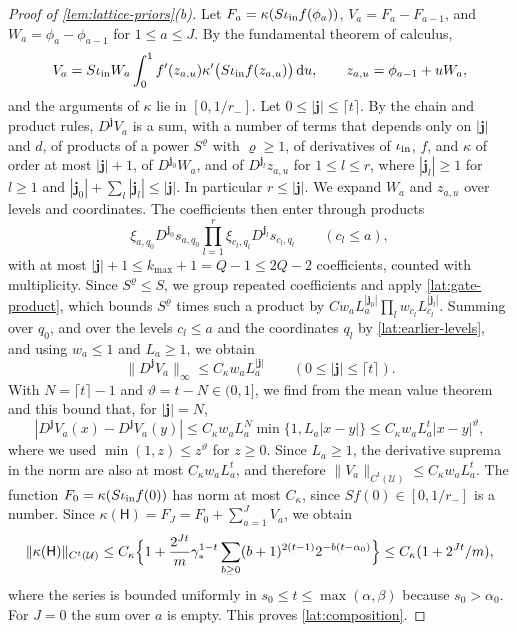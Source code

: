 \begin{proof}[Proof of \cref{lem:lattice-priors}(b)]
Let $F_a=\kappa(S\iota_{\rm in}f(\phi_a))$, $V_a=F_a-F_{a-1}$, and
$W_a=\phi_a-\phi_{a-1}$ for $1\le a\le J$. By the fundamental theorem
of calculus,
\[
 V_a=S\iota_{\rm in}W_a\int_0^1
 f'(z_{a,u})\kappa'\bigl(S\iota_{\rm in}f(z_{a,u})\bigr)\,\mathrm d u,
 \qquad z_{a,u}=\phi_{a-1}+uW_a,
\]
and the arguments of $\kappa$ lie in $[0,1/r_-]$. Let
$0\le|\mathbf j|\le\lceil t\rceil$. By the chain and product rules,
$D^{\mathbf j}V_a$ is a sum, with a number of terms that depends only
on $|\mathbf j|$ and $d$, of products of a power $S^\varrho$ with
$\varrho\ge1$, of derivatives of $\iota_{\rm in}$, $f$, and $\kappa$ of
order at most $|\mathbf j|+1$, of $D^{\mathbf j_0}W_a$, and of
$D^{\mathbf j_l}z_{a,u}$ for $1\le l\le r$, where $|\mathbf j_l|\ge1$
for $l\ge1$ and $|\mathbf j_0|+\sum_l|\mathbf j_l|\le|\mathbf j|$. In
particular $r\le|\mathbf j|$. We expand $W_a$ and $z_{a,u}$ over levels
and coordinates. The coefficients then enter through products
\[
 \xi_{a,q_0}D^{\mathbf j_0}s_{a,q_0}
 \prod_{l=1}^{r}\xi_{c_l,q_l}D^{\mathbf j_l}s_{c_l,q_l}
 \qquad(c_l\le a),
\]
with at most $|\mathbf j|+1\le k_{\max}+1=Q-1\le2Q-2$ coefficients,
counted with multiplicity. Since $S^\varrho\le S$, we group repeated
coefficients and apply \eqref{lat:gate-product}, which bounds $S^\varrho$
times such a product by
$Cw_aL_a^{|\mathbf j_0|}\prod_lw_{c_l}L_{c_l}^{|\mathbf j_l|}$.
Summing over $q_0$, and over the levels $c_l\le a$ and the coordinates
$q_l$ by \eqref{lat:earlier-levels}, and using $w_a\le1$ and
$L_a\ge1$, we obtain
\[
 \|D^{\mathbf j}V_a\|_\infty\le C_\kappa w_aL_a^{|\mathbf j|}
 \qquad(0\le|\mathbf j|\le\lceil t\rceil).
\]
With $N=\lceil t\rceil-1$ and $\vartheta=t-N\in(0,1]$, we find from
the mean value theorem and this bound that, for $|\mathbf j|=N$,
\[
 |D^{\mathbf j}V_a(x)-D^{\mathbf j}V_a(y)|
 \le C_\kappa w_aL_a^N\min\{1,L_a|x-y|\}
 \le C_\kappa w_aL_a^t|x-y|^\vartheta,
\]
where we used $\min(1,z)\le z^\vartheta$ for $z\ge0$. Since $L_a\ge1$,
the derivative suprema in the norm are also at most
$C_\kappa w_aL_a^t$, and therefore
$\|V_a\|_{C^t(\mathcal U)}\le C_\kappa w_aL_a^t$. The function
$F_0=\kappa(S\iota_{\rm in}f(0))$ has norm at most $C_\kappa$, since
$Sf(0)\in[0,1/r_-]$ is a number. Since
$\kappa(\mathsf H)=F_J=F_0+\sum_{a=1}^JV_a$, we obtain
\[
 \|\kappa(\mathsf H)\|_{C^t(\mathcal U)}
 \le C_\kappa\Bigl\{1+\frac{2^{Jt}}m\gamma_*^{1-t}
 \sum_{b\ge0}(b+1)^{2(t-1)}2^{-b(t-\alpha_0)}\Bigr\}
 \le C_\kappa(1+2^{Jt}/m),
\]
where the series is bounded uniformly in $s_0\le t\le\max(\alpha,\beta)$
because $s_0>\alpha_0$. For $J=0$ the sum over $a$ is empty. This
proves \eqref{lat:composition}.


\end{proof}
